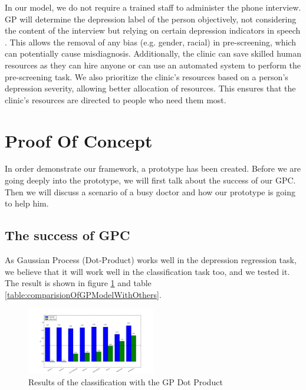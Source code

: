 \documentclass{article}
\begin{document}
    In our model, we do not require a trained staff to administer the phone interview. 
    GP will determine the depression label of the person objectively, not considering the content of the interview but relying on certain depression indicators in speech \cite{nimh2015}. 
    This allows the removal of any bias (e.g. gender, racial) in pre-screening, which can potentially cause misdiagnosis. 
    Additionally, the clinic can save skilled human resources as they can hire anyone or can use an automated system to perform the pre-screening task.
    We also prioritize the clinic's resources based on a person's depression severity, allowing better allocation of resources. 
    This ensures that the clinic's resources are directed to people who need them most. 	

	\section{Proof Of Concept}
In order demonstrate our framework, a prototype has been created. Before we are going deeply into the prototype, 
    we will first talk about the success of our GPC. Then we will discuss a scenario of a busy doctor and how our prototype is going to help him.
    
    \subsection{The success of GPC}
    As Gaussian Process (Dot-Product) works well in the depression regression task, we believe that it will work well in the classification task too, and we tested it. 
    The result is shown in figure \ref{figure:gp_dot_product} and table \ref{table:comparisionOfGPModelWithOthers}. \\
         \begin{figure}[h]
             \begin{center}
            \includegraphics[width=0.5\textwidth]{gp_dot_product}
              \end{center}
              \caption{Results of the classification with the GP Dot Product}
              \label{figure:gp_dot_product}
      \end{figure}
\end{document}
